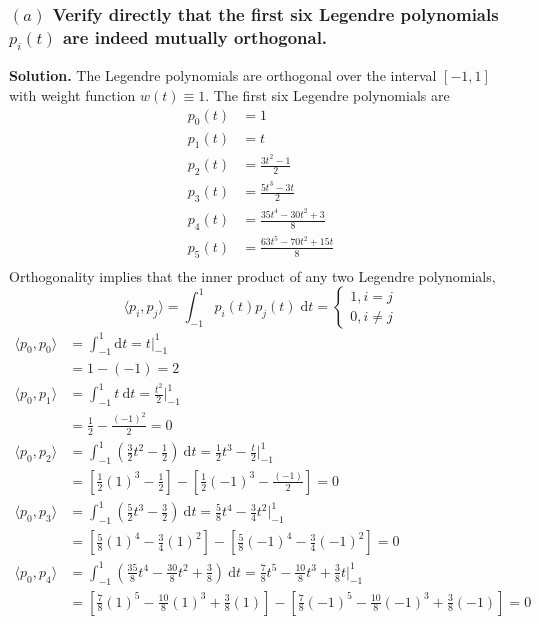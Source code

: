 \subsubsection*{$(a)$ Verify directly that the first six Legendre polynomials $p_i(t)$ are indeed mutually orthogonal.}
\textbf{Solution.} 
The Legendre polynomials are orthogonal over the interval $[-1,1]$ with weight function $w(t)\equiv 1$. The first six Legendre polynomials are
\begin{align*}
p_0(t) &= 1\\
p_1(t) &= t\\
p_2(t) &= \frac{3t^2-1}{2}\\
p_3(t) &= \frac{5t^3-3t}{2}\\
p_4(t) &= \frac{35t^4-30t^2+3}{8}\\
p_5(t) &= \frac{63t^5-70t^2+15t}{8}\\
\end{align*}
Orthogonality implies that the inner product of any two Legendre polynomials,
\begin{equation*}
\langle p_i,p_j \rangle=\int_{-1}^{1}p_i(t)p_j(t)\;\mathrm{d}t =
\begin{cases}
1, i = j \\
0, i \neq j
\end{cases}
\end{equation*}
\begin{align*}
\langle p_0, p_0 \rangle &= \int_{-1}^{1} \mathrm{d}t = t \Big|_{-1}^{1}\\ &= 1-(-1) = \boxed{2} \\
\langle p_0, p_1 \rangle &= \int_{-1}^{1} t\:\mathrm{d}t = \frac{t^2}{2} \Big|_{-1}^{1}\\ &= \frac{1}{2}-\frac{(-1)^2}{2} = \boxed{0} \\
\langle p_0, p_2 \rangle &= \int_{-1}^{1} \left(\frac{3}{2}t^2-\frac{1}{2}\right)\:\mathrm{d}t = \frac{1}{2}t^3-\frac{t}{2} \Big|_{-1}^1\\ &= \left[\frac{1}{2}(1)^3-\frac{1}{2}\right] - \left[\frac{1}{2}(-1)^3-\frac{(-1)}{2}\right] = \boxed{0} \\
\langle p_0, p_3 \rangle &= \int_{-1}^{1}\left(\frac{5}{2}t^3-\frac{3}{2}\right)\:\mathrm{d}t = \frac{5}{8}t^4-\frac{3}{4}t^2 \Big|_{-1}^1\\ &= \left[\frac{5}{8}(1)^4-\frac{3}{4}(1)^2\right] -  \left[\frac{5}{8}(-1)^4-\frac{3}{4}(-1)^2\right] = \boxed{0} \\
\langle p_0,p_4 \rangle &= \int_{-1}^{1}\left(\frac{35}{8}t^4-\frac{30}{8}t^2+\frac{3}{8}\right)\:\mathrm{d}t = \frac{7}{8}t^5-\frac{10}{8}t^3+\frac{3}{8}t \Big|_{-1}^{1}\\ &= \left[\frac{7}{8}(1)^5-\frac{10}{8}(1)^3+\frac{3}{8}(1)\right] - \left[\frac{7}{8}(-1)^5-\frac{10}{8}(-1)^3+\frac{3}{8}(-1)\right] = \boxed{0}\\
\end{align*}

